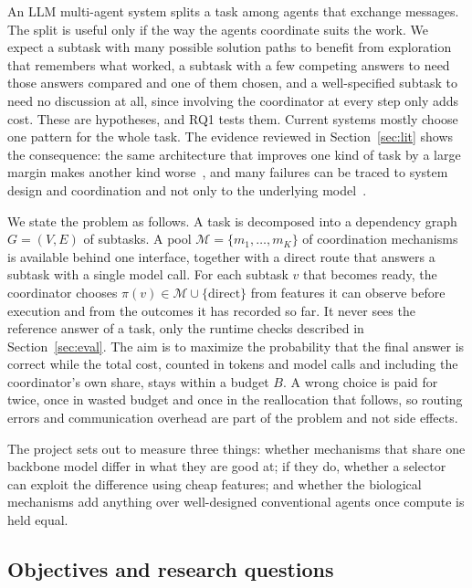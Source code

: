 \documentclass[11pt,a4paper]{article}
\begin{document}
An LLM multi-agent system splits a task among agents that exchange messages. The split is useful only
if the way the agents coordinate suits the work. We expect a subtask with many possible solution paths to
benefit from exploration that remembers what worked, a subtask with a few competing answers to need those
answers compared and one of them chosen, and a well-specified subtask to need no discussion at all, since
involving the coordinator at every step only adds cost. These are hypotheses, and RQ1 tests them. Current
systems mostly choose one pattern for the whole task. The evidence reviewed in Section~\ref{sec:lit} shows
the consequence: the same architecture that improves one kind of task by a large margin makes another kind
worse~\cite{kim2025scaling}, and many failures can be traced to system design and coordination and not only
to the underlying model~\cite{cemri2025mast}.

We state the problem as follows. A task is decomposed into a dependency graph $G=(V,E)$ of subtasks. A pool
$\mathcal{M}=\{m_1,\dots,m_K\}$ of coordination mechanisms is available behind one interface, together with
a direct route that answers a subtask with a single model call. For each subtask $v$ that becomes ready, the
coordinator chooses $\pi(v)\in\mathcal{M}\cup\{\text{direct}\}$ from features it can observe before
execution and from the outcomes it has recorded so far. It never sees the reference answer of a task, only
the runtime checks described in Section~\ref{sec:eval}. The aim is to maximize the probability that the
final answer is correct while the total cost, counted in tokens and model calls and including the
coordinator's own share, stays within a budget $B$. A wrong choice is paid for twice, once in wasted budget
and once in the reallocation that follows, so routing errors and communication overhead are part of the
problem and not side effects.

The project sets out to measure three things: whether mechanisms that share one backbone model differ in
what they are good at; if they do, whether a selector can exploit the difference using cheap features; and
whether the biological mechanisms add anything over well-designed conventional agents once compute is held
equal.

\subsection{Objectives and research questions}
\end{document}

